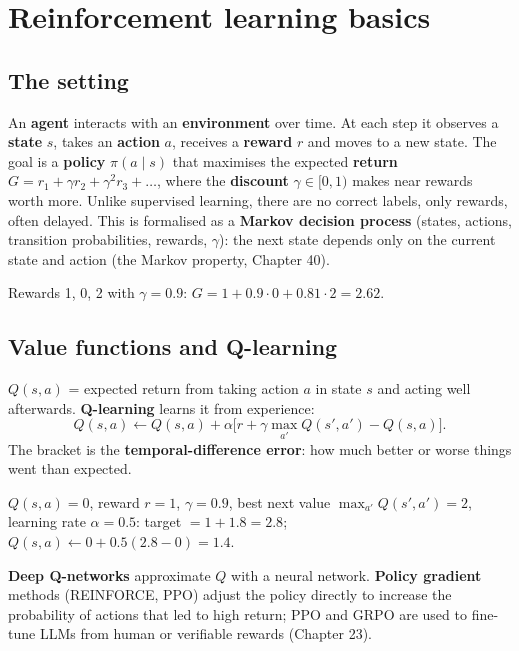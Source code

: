 \section{Reinforcement learning basics}
\subsection{The setting}
An \textbf{agent} interacts with an \textbf{environment} over time. At each step it observes a \textbf{state} $s$, takes an \textbf{action} $a$, receives a \textbf{reward} $r$
and moves to a new state. The goal is a \textbf{policy} $\pi(a\mid s)$ that maximises the expected \textbf{return} $G = r_1 + \gamma r_2 + \gamma^2r_3 + \dots$, where the
\textbf{discount} $\gamma\in[0,1)$ makes near rewards worth more. Unlike supervised learning, there are no correct labels, only rewards, often delayed.
This is formalised as a \textbf{Markov decision process} (states, actions, transition probabilities, rewards, $\gamma$): the next state depends only on the current state
and action (the Markov property, Chapter 40).

\begin{example}
Rewards 1, 0, 2 with $\gamma = 0.9$: $G = 1 + 0.9\cdot0 + 0.81\cdot2 = 2.62$.
\end{example}

\subsection{Value functions and Q-learning}
$Q(s, a)$ = expected return from taking action $a$ in state $s$ and acting well afterwards. \textbf{Q-learning} learns it from experience:
\[ Q(s,a)\leftarrow Q(s,a) + \alpha\big[r + \gamma\max_{a'}Q(s',a') - Q(s,a)\big]. \]
The bracket is the \textbf{temporal-difference error}: how much better or worse things went than expected.
\begin{example}
$Q(s,a) = 0$, reward $r = 1$, $\gamma = 0.9$, best next value $\max_{a'}Q(s',a') = 2$, learning rate $\alpha = 0.5$: target $= 1 + 1.8 = 2.8$;
$Q(s,a)\leftarrow0 + 0.5(2.8 - 0) = 1.4$.
\end{example}
\textbf{Deep Q-networks} approximate $Q$ with a neural network. \textbf{Policy gradient} methods (REINFORCE, PPO) adjust the policy directly to increase the probability of
actions that led to high return; PPO and GRPO are used to fine-tune LLMs from human or verifiable rewards (Chapter 23).

